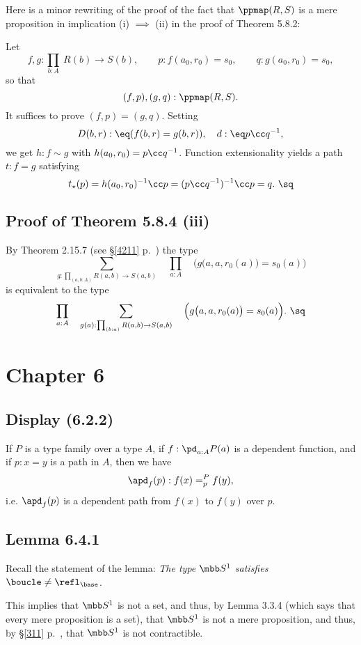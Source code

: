 \documentclass[12pt]{article}
\begin{document}
Here is a minor rewriting of the proof of the fact that $\ppmap(R,S)$ is a mere proposition in implication (i) $\implies$ (ii) in the proof of Theorem 5.8.2: 

Let 
$$
f,g:\prod_{b:A}\ R(b)\to S(b),\qquad p:f(a_0,r_0)=s_0,\qquad q:g(a_0,r_0)=s_0,
$$ 
so that 
$$
(f,p),(g,q):\ppmap(R,S).
$$ 
It suffices to prove $(f,p)=(g,q)$. Setting 
$$
D(b,r):\eq(f(b,r)=g(b,r)),\quad d:\eq p\cc q^{-1},
$$ 
we get $h:f\sim g$ %
with $h(a_0,r_0)=p\cc q^{-1}$. Function extensionality yields a path $t:f=g$ satisfying 
$$
t_\star(p)=h(a_0,r_0)^{-1}\cc p=(p\cc q^{-1})^{-1}\cc p=q.\ \sq
$$


\subsection{Proof of Theorem 5.8.4 (iii)}

By Theorem 2.15.7 (see \S\ref{4211} p.~\pageref{4211}) the type 
$$
\sum_{g:\prod_{(a,b:A)}R(a,b)\to S(a,b)}\quad\prod_{a:A}\quad\Big(g\big(a,a,r_0(a)\big)=s_0(a)\Big)
$$ 
is equivalent to the type
$$
\prod_{a:A}\quad\sum_{g(a):\prod_{(b:a)}R(a,b)\to S(a,b)}\quad\Big(g\big(a,a,r_0(a)\big)=s_0(a)\Big).\ \sq
$$


\section{Chapter 6}

\subsection{Display (6.2.2)}

If $P$ is a type family over a type $A$, if $f:\pd_{a:A}P(a)$ is a dependent function, and if $p:x=y$ is a path in $A$, then we have 
$$
\apd_f(p):f(x)=^P_pf(y),
$$ 
i.e. $\apd_f(p)$ is a dependent path from $f(x)$ to $f(y)$ over $p$.


\subsection{Lemma 6.4.1}

Recall the statement of the lemma: \emph{The type $\mbb S^1$ satisfies} $\boucle\neq\refl_{\base}$. 

This implies that $\mbb S^1$ is not a set, and thus, by Lemma 3.3.4 (which says that every mere proposition is a set), that $\mbb S^1$ is not a mere proposition, and thus, by \S\ref{311} p.~\pageref{311}, that $\mbb S^1$ is not contractible.
\end{document}
